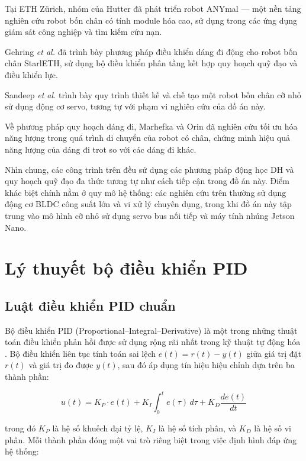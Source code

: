 Tại ETH Zürich, nhóm của Hutter đã phát triển robot ANYmal \cite{hutter2016} --- một nền tảng nghiên cứu robot bốn chân có tính module hóa cao, sử dụng trong các ứng dụng giám sát công nghiệp và tìm kiếm cứu nạn.

Gehring \textit{et al.} \cite{gehring2013} đã trình bày phương pháp điều khiển dáng đi động cho robot bốn chân StarlETH, sử dụng bộ điều khiển phân tầng kết hợp quy hoạch quỹ đạo và điều khiển lực.

Sandeep \textit{et al.} \cite{sandeep2021} trình bày quy trình thiết kế và chế tạo một robot bốn chân cỡ nhỏ sử dụng động cơ servo, tương tự với phạm vi nghiên cứu của đồ án này.

Về phương pháp quy hoạch dáng đi, Marhefka và Orin \cite{marhefka1999} đã nghiên cứu tối ưu hóa năng lượng trong quá trình di chuyển của robot có chân, chứng minh hiệu quả năng lượng của dáng đi trot so với các dáng đi khác.

Nhìn chung, các công trình trên đều sử dụng các phương pháp động học DH \cite{denavit1955} và quy hoạch quỹ đạo đa thức tương tự như cách tiếp cận trong đồ án này. Điểm khác biệt chính nằm ở quy mô hệ thống: các nghiên cứu trên thường sử dụng động cơ BLDC công suất lớn và vi xử lý chuyên dụng, trong khi đồ án này tập trung vào mô hình cỡ nhỏ sử dụng servo bus nối tiếp và máy tính nhúng Jetson Nano.

\section{Lý thuyết bộ điều khiển PID}

\subsection{Luật điều khiển PID chuẩn}

Bộ điều khiển PID (Proportional--Integral--Derivative) là một trong những thuật toán điều khiển phản hồi được sử dụng rộng rãi nhất trong kỹ thuật tự động hóa \cite{astrom2006}. Bộ điều khiển liên tục tính toán sai lệch $e(t) = r(t) - y(t)$ giữa giá trị đặt $r(t)$ và giá trị đo được $y(t)$, sau đó áp dụng tín hiệu hiệu chỉnh dựa trên ba thành phần:

\begin{equation}
    u(t) = K_P \cdot e(t) + K_I \int_{0}^{t} e(\tau)\,d\tau + K_D \frac{de(t)}{dt}
    \label{eq:pid_continuous}
\end{equation}

trong đó $K_P$ là hệ số khuếch đại tỷ lệ, $K_I$ là hệ số tích phân, và $K_D$ là hệ số vi phân. Mỗi thành phần đóng một vai trò riêng biệt trong việc định hình đáp ứng hệ thống:

